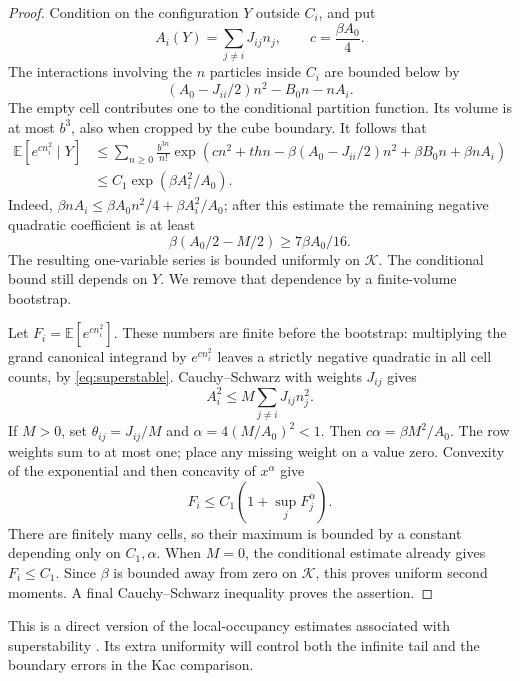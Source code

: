 \begin{proof}
Condition on the configuration \(Y\) outside \(C_i\), and put
\[
 A_i(Y)=\sum_{j\ne i}J_{ij}n_j,\qquad c=\frac{\beta A_0}{4}.
\]
The interactions involving the \(n\) particles inside \(C_i\) are bounded
below by
\[
 (A_0-J_{ii}/2)n^2-B_0n-nA_i.
\]
The empty cell contributes one to the conditional partition function.
Its volume is at most \(b^3\), also when cropped by the cube boundary.
It follows that
\begin{align*}
 \mathbb E[e^{c n_i^2}\mid Y]
 &\le
 \sum_{n\ge0}\frac{b^{3n}}{n!}
 \exp\!\left(cn^2+thn-\beta(A_0-J_{ii}/2)n^2
                  +\beta B_0n+\beta nA_i\right)\\
 &\le C_1\exp(\beta A_i^2/A_0).
\end{align*}
Indeed,
\(\beta nA_i\le\beta A_0n^2/4+\beta A_i^2/A_0\);
after this estimate the remaining negative quadratic coefficient is at least
\[
 \beta(A_0/2-M/2)\ge 7\beta A_0/16.
\]
The resulting one-variable series is bounded uniformly on \(\mathcal K\).
The conditional bound still depends on \(Y\).  We remove that dependence
by a finite-volume bootstrap.

Let \(F_i=\mathbb E[e^{c n_i^2}]\).  These numbers are finite before the
bootstrap: multiplying the grand canonical integrand by \(e^{cn_i^2}\)
leaves a strictly negative quadratic in all cell counts, by
\eqref{eq:superstable}.  Cauchy--Schwarz with weights \(J_{ij}\) gives
\[
 A_i^2\le M\sum_{j\ne i}J_{ij}n_j^2.
\]
If \(M>0\), set \(\theta_{ij}=J_{ij}/M\) and
\(\alpha=4(M/A_0)^2<1\).  Then $c\alpha=\beta M^2/A_0$. The row weights sum to at most one;
place any missing weight on a value zero. Convexity of the exponential and then
concavity of \(x^\alpha\) give
\[
 F_i\le C_1\left(1+\sup_j F_j^\alpha\right).
\]
There are finitely many cells, so their maximum is bounded by a constant
depending only on \(C_1,\alpha\).  When \(M=0\), the conditional estimate
already gives \(F_i\le C_1\).  Since \(\beta\) is bounded away from zero on
\(\mathcal K\), this proves uniform second moments.  A final
Cauchy--Schwarz inequality proves the assertion.
\end{proof}

This is a direct version of the local-occupancy estimates associated with
superstability \cite{Ruelle1970}.  Its extra uniformity will control both
the infinite tail and the boundary errors in the Kac comparison.

